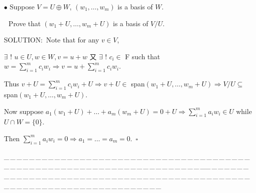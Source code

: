 \documentclass[a4paper, 11pt, UTF8]{article}
\begin{document}
\begin{large}
{\small $\bullet$} {\timessl\Large 
Suppose $V=U\oplus W$, $(w_1,\dots,w_m)$ is a basis of $W$.}\par\,\,
{\timessl\Large Prove that $(w_1+U,\dots,w_m+U)$ is a basis of $V/U$.
}\par
{\timesbf S\footnotesize{OLUTION:}}\,\,\,Note that for any $v\in V$,\par\quad
$\exists\,\,!\,\,u\in U,w\in W,v=u+w$ 又 $\exists\,\,!\,\,c_i\in$ {\timesbf F} such that $w=\sum\limits_{i=1}^m c_i w_i\Rightarrow v=u+\sum\limits_{i=1}^m c_i w_i$.\par\quad
Thus $v+U=\sum\limits_{i=1}^m c_i w_i+U\Rightarrow v+U\in$ span$(w_1+U,\dots,w_m+U)\Rightarrow V/U\subseteq$ span$(w_1+U,\dots,w_m+U)$.\par\quad
Now suppose $a_1(w_1+U)+\dots+a_m(w_m+U)=0+U\Rightarrow\sum\limits_{i=1}^m a_i w_i\in U$ while $U\cap W=\{0\}$.\par\quad
Then $\sum\limits_{i=1}^m a_i w_i=0\Rightarrow a_1=\dots=a_m=0.\,\,\,\square$
\par
{\tiny \_\,\_\,\_\,\_\,\_\,\_\,\_\,\_\,\_\,\_\,\_\,\_\,\_\,\_\,\_\,\_\,\_\,\_\,\_\,\_\,\_\,\_\,\_\,\_\,\_\,\_\,\_\,\_\,\_\,\_\,\_\,\_\,\_\,\_\,\_\,\_\,\_\,\_\,\_\,\_\,\_\,\_\,\_\,\_\,\_\,\_\,\_\,\_\,\_\,\_\,\_\,\_\,\_\,\_\,\_\,\_\,\_\,\_\,\_\,\_\,\_\,\_\,\_\,\_\,\_\,\_\,\_\,\_\,\_\,\_\,\_\_\,\_\,\_\,\_\,\_\,\_\,\_\,\_\,\_\,\_\,\_\,\_\,\_\,\_\,\_\,\_\,\_\,\_\,\_\,\_\,\_\,\_\,\_\,\_\,\_\,\_\,\_\,\_\,\_\,\_\,\_\,\_\,\_\,\_\,\_\,\_\,\_\,\_\,\_\,\_\,\_\,\_\,\_\,\_\,\_\,\_\,\_\,\_\,\_\,\_\,\_\,\_\,\_\,\_\,\_\,\_\,\_\,\_\,\_\,\_\,\_\,\_\,\_\,\_\,\_\,\_\,\_\,\_\,\_\,\_\,\_}\par


\end{large}
\end{document}
